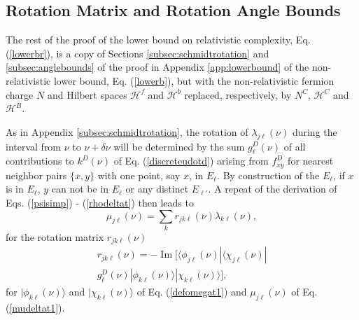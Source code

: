 \documentclass[12pt,amsmath,amssymb,onecolumn]{revtex4-2}
\begin{document}
\subsection{\label{subsec:rest} Rotation Matrix and Rotation Angle Bounds}

The rest of the proof of the lower bound
on relativistic complexity, Eq. (\ref{lowerbr}),
is a copy of
Sections \ref{subsec:schmidtrotation} and \ref{subsec:anglebounds}
of the proof in Appendix \ref{app:lowerbound}
of the non-relativistic lower bound, Eq. (\ref{lowerb}), 
but with the non-relativistic fermion charge $N$ and
Hilbert spaces $\mathcal{H}^f$ and $\mathcal{H}^b$ replaced,
respectively, by $N^C$, $\mathcal{H}^C$ and $\mathcal{H}^B$.

As in Appendix \ref{subsec:schmidtrotation}, the rotation of
$\lambda_{j \ell}(\nu)$ during the interval from $\nu$ to $\nu + \delta \nu$
will be determined by the sum $g^D_{\ell}(\nu)$ of all contributions to $k^D(\nu)$
of Eq. (\ref{discreteudotd})
arising from $f^D_{xy}$ for nearest neighbor pairs $\{x,y\}$ with
one point, say $x$, in $E_\ell$. By construction of
the $E_\ell$, if $x$ is in $E_\ell$, $y$ can not be
in $E_\ell$ or any distinct $E_{\ell'}$.
A repeat of the derivation of Eqs. (\ref{psisimp}) - (\ref{rhodeltat}) 
then leads to
\begin{equation}
\label{ufromperturb1}
\mu_{j\ell}(\nu) = \sum_k r_{jk\ell}(\nu) \lambda_{k\ell}(\nu), 
\end{equation}
for the rotation matrix $r_{jk\ell}(\nu)$
\begin{multline}
\label{rijp1}
r_{jk\ell}(\nu) = 
 -\operatorname{Im}[  \langle \phi_{j\ell}(\nu)| \langle \chi_{j\ell}(\nu)| \\
g^D_{\ell}(\nu)|\phi_{k\ell}(\nu) \rangle |\chi_{k\ell}(\nu) \rangle ],
\end{multline}
for $|\phi_{k\ell}(\nu) \rangle $ and $|\chi_{k\ell}(\nu) \rangle $ of Eq. (\ref{defomegat1})
and $\mu_{j\ell}(\nu)$ of Eq. (\ref{mudeltat1}).
\end{document}
